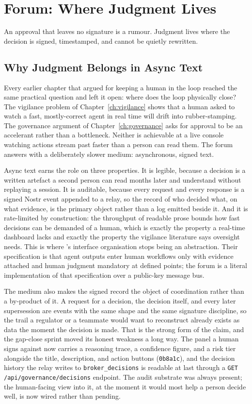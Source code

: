 \chapter{Forum: Where Judgment Lives}
\label{ch:forum-governance}

\epigraph{An approval that leaves no signature is a rumour. Judgment lives where the decision is signed, timestamped, and cannot be quietly rewritten.}{}

\section{Why Judgment Belongs in Async Text}

Every earlier chapter that argued for keeping a human in the loop reached the same practical question and left it open: where does the loop physically close? The vigilance problem of Chapter~\ref{ch:vigilance} shows that a human asked to watch a fast, mostly-correct agent in real time will drift into rubber-stamping. The governance argument of Chapter~\ref{ch:governance} asks for approval to be an accelerant rather than a bottleneck. Neither is achievable at a live console watching actions stream past faster than a person can read them. The forum answers with a deliberately slower medium: asynchronous, signed text.

Async text earns the role on three properties. It is legible, because a decision is a written artefact a second person can read months later and understand without replaying a session. It is auditable, because every request and every response is a signed Nostr event appended to a relay, so the record of who decided what, on what evidence, is the primary object rather than a log emitted beside it. And it is rate-limited by construction: the throughput of readable prose bounds how fast decisions can be demanded of a human, which is exactly the property a real-time dashboard lacks and exactly the property the vigilance literature says oversight needs. This is where \textcite{Liu2026}'s interface organisation stops being an abstraction. Their specification is that agent outputs enter human workflows only with evidence attached and human judgment mandatory at defined points; the forum is a literal implementation of that specification over a public-key message bus.

The medium also makes the signed record the object of coordination rather than a by-product of it. A request for a decision, the decision itself, and every later supersession are events with the same shape and the same signature discipline, so the trail a regulator or a teammate would want to reconstruct already exists as data the moment the decision is made. That is the strong form of the claim, and the gap-close sprint moved its honest weakness a long way. The panel a human signs against now carries a reasoning trace, a confidence figure, and a risk tier alongside the title, description, and action buttons (\texttt{0b8a1c}), and the decision history the relay writes to \texttt{broker\_decisions} is readable at last through a \texttt{GET /api/governance/decisions} endpoint. The audit substrate was always present; the human-facing view into it, at the moment it would most help a person decide well, is now wired rather than pending.

